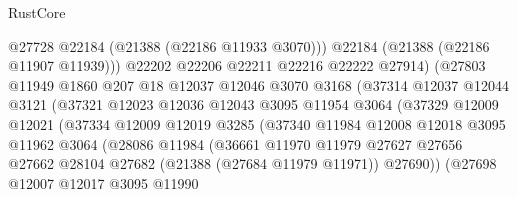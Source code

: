 \begin{lexlean}{RustCore}
\begin{coremodule}
                                @27728
                                @22184
                                (@21388 (@22186 @11933 @3070)))
                              @22184
                              (@21388 (@22186 @11907 @11939)))
                            @22202
                            @22206
                            @22211
                            @22216
                            @22222
                            @27914)
                          (@27803
                            @11949
                            @1860
                            @207
                            @18
                            @12037
                            @12046
                            @3070
                            @3168
                            (@37314
                              @12037
                              @12044
                              @3121
                              (@37321
                                @12023
                                @12036
                                @12043
                                @3095
                                @11954
                                @3064
                                (@37329
                                  @12009
                                  @12021
                                  (@37334
                                    @12009
                                    @12019
                                    @3285
                                    (@37340
                                      @11984
                                      @12008
                                      @12018
                                      @3095
                                      @11962
                                      @3064
                                      (@28086
                                        @11984
                                        (@36661
                                          @11970
                                          @11979
                                          @27627
                                          @27656
                                          @27662
                                          @28104
                                          @27682
                                          (@21388 (@27684 @11979 @11971))
                                          @27690))
                                      (@27698
                                        @12007
                                        @12017
                                        @3095
                                        @11990

\end{coremodule}
\end{lexlean}
